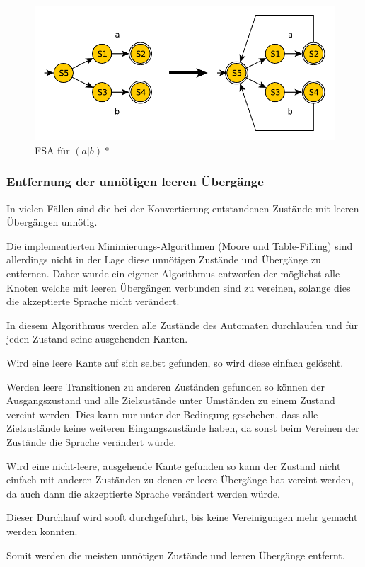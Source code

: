 \begin{figure}[h]
  \centering
  \includegraphics{objectsToInclude/re_fsa_(aOrb)STAR.pdf}
  \caption{FSA für $(a|b)*$}
\label{fig:Kleene-Stern}
\end{figure}

\subsubsection{Entfernung der unnötigen leeren Übergänge}
In vielen Fällen sind die bei der Konvertierung entstandenen Zustände mit leeren
Übergängen unnötig.

Die implementierten Minimierungs-Algorithmen (Moore und Table-Filling) sind
allerdings nicht in der Lage diese unnötigen Zustände und Übergänge zu entfernen.
Daher wurde ein eigener Algorithmus entworfen der möglichst alle Knoten welche mit
leeren Übergängen verbunden sind zu vereinen, solange dies die akzeptierte Sprache
nicht verändert.

In diesem Algorithmus werden alle Zustände des Automaten durchlaufen und für
jeden Zustand seine ausgehenden Kanten.

Wird eine leere Kante auf sich selbst gefunden, so wird diese einfach gelöscht.

Werden leere Transitionen zu anderen Zuständen gefunden so können der
Ausgangszustand und alle Zielzustände unter Umständen zu einem Zustand vereint
werden. Dies kann nur unter der Bedingung geschehen, dass alle Zielzustände keine
weiteren Eingangszustände haben, da sonst beim Vereinen der Zustände die Sprache
verändert würde.

Wird eine nicht-leere, ausgehende Kante gefunden so kann der Zustand nicht einfach
mit anderen Zuständen zu denen er leere Übergänge hat vereint werden, da auch
dann die akzeptierte Sprache verändert werden würde.

Dieser Durchlauf wird sooft durchgeführt, bis keine Vereinigungen mehr gemacht
werden konnten.

Somit werden die meisten unnötigen Zustände und leeren Übergänge entfernt.


